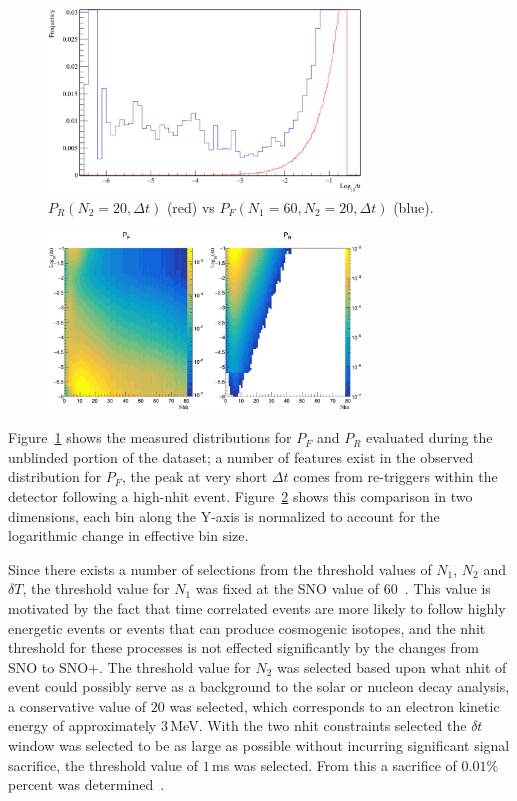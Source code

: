 \begin{appendices}
\begin{figure}[htbp]
    \centering
    \includegraphics[width=0.74\textwidth]{mmf_pr_v_pf}
    \caption[Missed Muon Follower Example PDFs]{
        $P_R(N_2=20, \Delta t)$ (red) vs $P_F(N_1=60, N_2=20, \Delta t)$ (blue).}
\label{fig:mmf_sac}
\end{figure}
\begin{figure}[htbp]
    \centering
    \includegraphics[width=0.74\textwidth]{mmf_bin_volume_normalized}
    \caption[Two-Dimensional Comparison for Missed Muon Follower]{
}
\label{fig:mmf_sac2}
\end{figure}
Figure~\ref{fig:mmf_sac} shows the measured distributions for $P_{F}$ and $P_{R}$
evaluated during the unblinded portion of the dataset;
a number of features exist in the observed distribution for $P_{F}$,
the peak at very short $\Delta t$ comes from re-triggers within the
detector following a high-nhit event.
Figure~\ref{fig:mmf_sac2} shows this comparison in two dimensions, each
bin along the Y-axis is normalized to account for the logarithmic change
in effective bin size.

Since there exists a number of selections from the threshold values of $N_{1}$,
$N_{2}$ and $\delta T$, the threshold value for $N_{1}$ was fixed at the SNO value
of $60$~\citep{neil_thesis}.
This value is motivated by the fact that time correlated events are more
likely to follow highly energetic events or events that can produce cosmogenic
isotopes, and the nhit threshold for these processes is not effected significantly
by the changes from SNO to SNO+.
The threshold value for $N_{2}$ was selected based upon what nhit of event
could possibly serve as a background to the solar or nucleon decay analysis,
a conservative value of $20$ was selected, which corresponds to an electron kinetic energy
of approximately $3$\,MeV.
With the two nhit constraints selected the $\delta t$ window was selected to
be as large as possible without incurring significant signal sacrifice,
the threshold value of $1$\,ms was selected.
From this a sacrifice of $0.01\%$ percent was determined~\citep{dc_document}.


\end{appendices}
